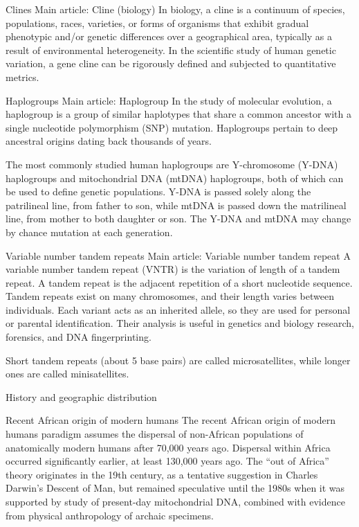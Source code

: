 Clines
Main article: Cline (biology)
In biology, a cline is a continuum of species, populations, races, varieties, or forms of organisms that exhibit gradual phenotypic and/or genetic differences over a geographical area, typically as a result of environmental heterogeneity. In the scientific study of human genetic variation, a gene cline can be rigorously defined and subjected to quantitative metrics.

Haplogroups
Main article: Haplogroup
In the study of molecular evolution, a haplogroup is a group of similar haplotypes that share a common ancestor with a single nucleotide polymorphism (SNP) mutation. Haplogroups pertain to deep ancestral origins dating back thousands of years.

The most commonly studied human haplogroups are Y-chromosome (Y-DNA) haplogroups and mitochondrial DNA (mtDNA) haplogroups, both of which can be used to define genetic populations. Y-DNA is passed solely along the patrilineal line, from father to son, while mtDNA is passed down the matrilineal line, from mother to both daughter or son. The Y-DNA and mtDNA may change by chance mutation at each generation.

Variable number tandem repeats
Main article: Variable number tandem repeat
A variable number tandem repeat (VNTR) is the variation of length of a tandem repeat. A tandem repeat is the adjacent repetition of a short nucleotide sequence. Tandem repeats exist on many chromosomes, and their length varies between individuals. Each variant acts as an inherited allele, so they are used for personal or parental identification. Their analysis is useful in genetics and biology research, forensics, and DNA fingerprinting.

Short tandem repeats (about 5 base pairs) are called microsatellites, while longer ones are called minisatellites.

History and geographic distribution

Recent African origin of modern humans
The recent African origin of modern humans paradigm assumes the dispersal of non-African populations of anatomically modern humans after 70,000 years ago. Dispersal within Africa occurred significantly earlier, at least 130,000 years ago. The ``out of Africa'' theory originates in the 19th century, as a tentative suggestion in Charles Darwin's Descent of Man, but remained speculative until the 1980s when it was supported by study of present-day mitochondrial DNA, combined with evidence from physical anthropology of archaic specimens.


